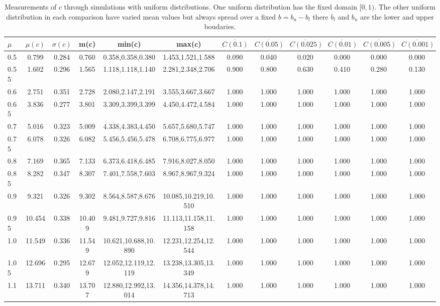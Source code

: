 \begin{table*}[h!]
\begin{center}
\begin{tabular}{| l | c | c | c | c | c | c | c | c | c | c | c |}\hline
$\mu$ & $\mu(c)$ & $\sigma(c)$ & m(c) & min(c) & max(c) & $\overline{C(0.1)}$ & $\overline{C(0.05)}$ & $\overline{C(0.025)}$ & $\overline{C(0.01)}$ & $\overline{C(0.005)}$ & $\overline{C(0.001)}$ \\\hline
0.5 & 0.799 & 0.284 & 0.760 & 0.358,0.358,0.380 & 1.453,1.521,1.588  & 0.090  & 0.040  & 0.020  & 0.000  & 0.000  & 0.000 \\\hline
0.55 & 1.602 & 0.296 & 1.565 & 1.118,1.118,1.140 & 2.281,2.348,2.706  & 0.900  & 0.800  & 0.630  & 0.410  & 0.280  & 0.130 \\\hline
0.6 & 2.751 & 0.351 & 2.728 & 2.080,2.147,2.191 & 3.555,3.667,3.667  & 1.000  & 1.000  & 1.000  & 1.000  & 1.000  & 1.000 \\\hline
0.65 & 3.836 & 0.277 & 3.801 & 3.309,3.399,3.399 & 4.450,4.472,4.584  & 1.000  & 1.000  & 1.000  & 1.000  & 1.000  & 1.000 \\\hline
0.7 & 5.016 & 0.323 & 5.009 & 4.338,4.383,4.450 & 5.657,5.680,5.747  & 1.000  & 1.000  & 1.000  & 1.000  & 1.000  & 1.000 \\\hline
0.75 & 6.078 & 0.326 & 6.082 & 5.456,5.456,5.478 & 6.708,6.775,6.977  & 1.000  & 1.000  & 1.000  & 1.000  & 1.000  & 1.000 \\\hline
0.8 & 7.169 & 0.365 & 7.133 & 6.373,6.418,6.485 & 7.916,8.027,8.050  & 1.000  & 1.000  & 1.000  & 1.000  & 1.000  & 1.000 \\\hline
0.85 & 8.282 & 0.347 & 8.307 & 7.401,7.558,7.603 & 8.967,8.967,9.324  & 1.000  & 1.000  & 1.000  & 1.000  & 1.000  & 1.000 \\\hline
0.9 & 9.321 & 0.326 & 9.302 & 8.564,8.587,8.676 & 10.085,10.219,10.510  & 1.000  & 1.000  & 1.000  & 1.000  & 1.000  & 1.000 \\\hline
0.95 & 10.454 & 0.338 & 10.409 & 9.481,9.727,9.816 & 11.113,11.158,11.158  & 1.000  & 1.000  & 1.000  & 1.000  & 1.000  & 1.000 \\\hline
1.0 & 11.549 & 0.336 & 11.549 & 10.621,10.688,10.890 & 12.231,12.254,12.544  & 1.000  & 1.000  & 1.000  & 1.000  & 1.000  & 1.000 \\\hline
1.05 & 12.696 & 0.295 & 12.679 & 12.052,12.119,12.119 & 13.238,13.305,13.349  & 1.000  & 1.000  & 1.000  & 1.000  & 1.000  & 1.000 \\\hline
1.1 & 13.711 & 0.340 & 13.707 & 12.880,12.992,13.014 & 14.356,14.378,14.713  & 1.000  & 1.000  & 1.000  & 1.000  & 1.000  & 1.000 \\\hline
\end{tabular}
\caption{Measurements of $c$ through simulations
with uniform distributions.
One uniform distribution has the fixed domain $[0,1)$.
The other uniform distribution in each comparison
have varied mean values but always
spread over a fixed $b=b_u-b_l$ there $b_l$ and $b_u$ are the lower and upper boudaries.}
\end{center}
\end{table*}